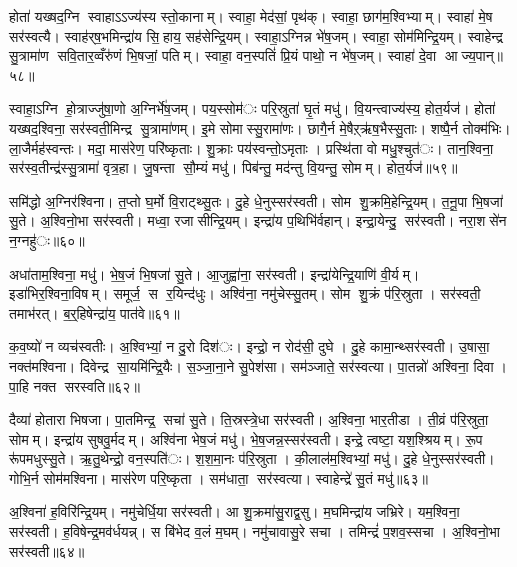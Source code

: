 होता॑ यख्षद॒ग्नि स्वाहाऽऽज्य॑स्य स्तो॒कानाम्। स्वाहा॒ मेद॑सां॒ पृथ॑क्। स्वाहा॒ छाग॑म॒श्विभ्याम्। स्वाहा॑ मे॒ष सर॑स्वत्यै। स्वाह॑र्‌ष॒भमिन्द्रा॑य सि॒हाय॒ सह॑सेन्द्रि॒यम्। स्वाहा॒ऽग्निन्न भे॑ष॒जम्। स्वाहा॒ सोम॑मिन्द्रि॒यम्। स्वाहेन्द्र सु॒त्रामा॑ण सवि॒तार॒व्वँरु॑णं भि॒षजां॒ पतिम्। स्वाहा॒ वन॒स्पतिं॑ प्रि॒यं पाथो॒ न भे॑ष॒जम्। स्वाहा॑ दे॒वा आज्य॒पान्॥५८॥

स्वाहा॒ऽग्नि हो॒त्राज्जु॑षा॒णो अ॒ग्निर्भे॑ष॒जम्। पय॒स्सोम॑ः परि॒स्रुता॑ घृ॒तं मधु॑। वि॒यन्त्वाज्य॑स्य॒ होत॒र्यज॑। होता॑ यख्षद॒श्विना॒ सर॑स्वती॒मिन्द्र सु॒त्रामा॑णम्। इ॒मे सोमास्सु॒रामा॑णः। छागै॒र्न मे॒षैऱ्ऋ॑ष॒भैस्सु॒ताः। शष्पै॒र्न तोक्म॑भिः। ला॒जैर्मह॑स्वन्तः। मदा॒ मास॑रेण॒ परि॑ष्कृताः। शु॒क्राः पय॑स्वन्तो॒ऽमृताः। प्रस्थि॑ता वो मधु॒श्चुत॑ः। तान॒श्विना॒ सर॑स्व॒तीन्द्र॑स्सु॒त्रामा॑ वृत्र॒हा। जु॒षन्ता सौ॒म्यं मधु॑। पिब॑न्तु॒ मद॑न्तु वि॒यन्तु॒ सोमम्। होत॒र्यज॑॥५९॥


समि॑द्धो अ॒ग्निर॑श्विना। त॒प्तो घ॒र्मो वि॒राट्थ्सु॒तः। दु॒हे धे॒नुस्सर॑स्वती। सोम शु॒क्रमि॒हेन्द्रि॒यम्। त॒नू॒पा भि॒षजा॑ सु॒ते। अ॒श्विनो॒भा सर॑स्वती। मध्वा॒ रजासीन्द्रि॒यम्। इन्द्रा॑य प॒थिभि॑र्वहान्। इन्द्रा॒येन्दु॒ सर॑स्वती। नरा॒शसे॑न न॒ग्नहु॑ः॥६०॥

अधा॑ताम॒श्विना॒ मधु॑। भे॒ष॒जं भि॒षजा॑ सु॒ते। आ॒जुह्वा॑ना॒ सर॑स्वती। इन्द्रा॑येन्द्रि॒याणि॑ वी॒र्यम्। इडा॑भिर॒श्विना॒विषम्। समूर्ज॒ स र॒यिन्द॑धुः। अश्वि॑ना॒ नमु॑चेस्सु॒तम्। सोम शु॒क्रं प॑रि॒स्रुता। सर॑स्वती॒ तमाभ॑रत्। ब॒र्॒हिषेन्द्रा॑य॒ पात॑वे॥६१॥

क॒व॒ष्यो॑ न व्यच॑स्वतीः। अ॒श्विभ्यां॒ न दु॒रो दिश॑ः। इन्द्रो॒ न रोद॑सी॒ दुघे। दु॒हे कामा॒न्थ्सर॑स्वती। उ॒षासा॒ नक्त॑मश्विना। दिवेन्द्र सा॒यमि॑न्द्रि॒यैः। स॒ञ्जा॒ना॒ने सु॒पेश॑सा। सम॑ञ्जाते॒ सर॑स्वत्या। पा॒तन्नो॑ अश्विना॒ दिवा। पा॒हि नक्त सरस्वति॥६२॥

दैव्या॑ होतारा भिषजा। पा॒तमिन्द्र॒ सचा॑ सु॒ते। ति॒स्रस्त्रे॒धा सर॑स्वती। अ॒श्विना॒ भार॒तीडा। ती॒व्रं प॑रि॒स्रुता॒ सोमम्। इन्द्रा॑य सुषवु॒र्मदम्। अश्वि॑ना भेष॒जं मधु॑। भे॒ष॒जन्न॒स्सर॑स्वती। इन्द्रे॒ त्वष्टा॒ यश॒श्श्रियम्। रू॒प रू॑पमधुस्सु॒ते। ऋ॒तु॒थेन्द्रो॒ वन॒स्पति॑ः। श॒श॒मा॒नः प॑रि॒स्रुता। की॒लाल॑म॒श्विभ्यां॒ मधु॑। दु॒हे धे॒नुस्सर॑स्वती। गोभि॒र्न सोम॑मश्विना। मास॑रेण परि॒ष्कृता। सम॑धाता॒ सर॑स्वत्या। स्वाहेन्द्रे॑ सु॒तं मधु॑॥६३॥


अ॒श्विना॑ ह॒विरि॑न्द्रि॒यम्। नमु॑चेर्धि॒या सर॑स्वती। आ शु॒क्रमा॑सु॒राद्व॒सु। म॒घमिन्द्रा॑य जभ्रिरे। यम॒श्विना॒ सर॑स्वती। ह॒विषेन्द्र॒मव॑र्धयन्न्। स बि॑भेद व॒लं म॒घम्। नमु॑चावासु॒रे सचा। तमिन्द्रं॑ प॒शव॒स्सचा। अ॒श्विनो॒भा सर॑स्वती॥६४॥

